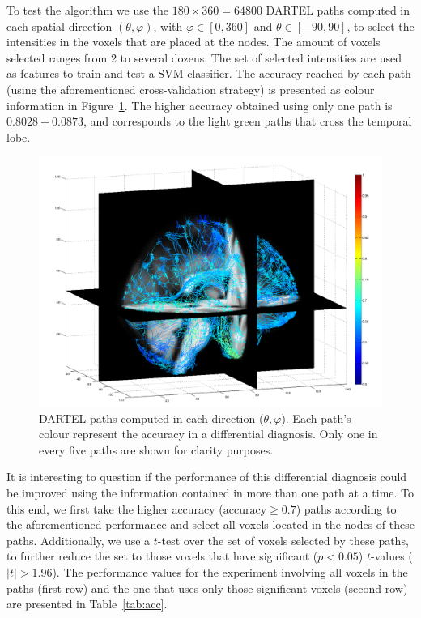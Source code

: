 To test the algorithm we use the $180\times360=64800$ DARTEL paths computed in each spatial direction $(\theta,\varphi)$, with $\varphi\in[0,360]$ and $\theta\in[-90,90]$, to select the intensities in the voxels that are placed at the nodes. The amount of voxels selected ranges from 2 to several dozens. The set of selected intensities are used as features to train and test a SVM classifier. The accuracy reached by each path (using the aforementioned cross-validation strategy) is presented as colour information in Figure~\ref{fig:accuracyMap}. The higher accuracy obtained using only one path is $0.8028\pm0.0873$, and corresponds to the light green paths that cross the temporal lobe. 

\begin{figure}
	\begin{center}
		\includegraphics[width=\columnwidth]{Graphics/ch6/accuracyPaths2}
		\caption{DARTEL paths computed in each direction ($\theta,\varphi$). Each path's colour represent the accuracy in a differential diagnosis. Only one in every five paths are shown for clarity purposes.}
		\label{fig:accuracyMap}
	\end{center}
\end{figure}

It is interesting to question if the performance of this differential diagnosis could be improved using the information contained in more than one path at a time. To this end, we first take the higher accuracy ($\text{accuracy} \ge0.7$) paths according to the aforementioned performance and select all voxels located in the nodes of these paths. Additionally, we use a $t$-test over the set of voxels selected by these paths, to further reduce the set to those voxels that have significant ($p<0.05$) $t$-values ($|t|>1.96$). The performance values for the experiment involving all voxels in the paths (first row) and the one that uses only those significant voxels (second row) are presented in Table~\ref{tab:acc}. 

